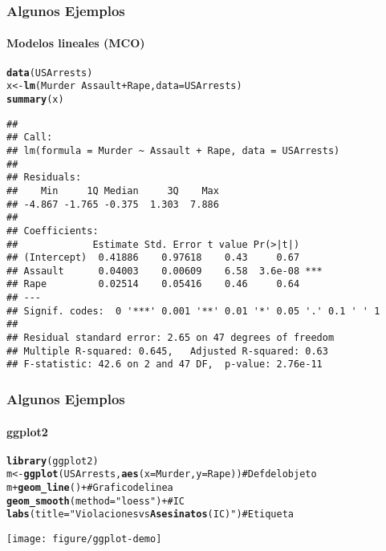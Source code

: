 \documentclass[10pt, letterpaper]{beamer}\usepackage{graphicx, color}
\makeatletter
\newcommand{\hlfunctioncall}[1]{\textcolor[rgb]{0.501960784313725,0,0.329411764705882}{\textbf{#1}}}%
\newcommand{\hlstring}[1]{\textcolor[rgb]{0.6,0.6,1}{#1}}%
\newcommand{\hlcomment}[1]{\textcolor[rgb]{0.180392156862745,0.6,0.341176470588235}{#1}}%
\newenvironment{kframe}{%
 \def\at@end@of@kframe{}%
 \ifinner\ifhmode%
  \def\at@end@of@kframe{\end{minipage}}%
  \begin{minipage}{\columnwidth}%
 \fi\fi%
 \def\FrameCommand##1{\hskip\@totalleftmargin \hskip-\fboxsep
 \colorbox{shadecolor}{##1}\hskip-\fboxsep
     \hskip-\linewidth \hskip-\@totalleftmargin \hskip\columnwidth}%
 \MakeFramed {\advance\hsize-\width
   \@totalleftmargin\z@ \linewidth\hsize
   \@setminipage}}%
 {\par\unskip\endMakeFramed%
 \at@end@of@kframe}
\newenvironment{knitrout}{}{} %
\makeatother
\begin{document}
\begin{frame}[fragile]
\frametitle{Algunos Ejemplos}
\framesubtitle{Modelos lineales (MCO)}
\begin{knitrout}\scriptsize
{}\color{fgcolor}\begin{kframe}
\begin{alltt}
\hlfunctioncall{data}(USArrests)
x <- \hlfunctioncall{lm}(Murder ~ Assault + Rape, data = USArrests)
\hlfunctioncall{summary}(x)
\end{alltt}
\begin{verbatim}
## 
## Call:
## lm(formula = Murder ~ Assault + Rape, data = USArrests)
## 
## Residuals:
##    Min     1Q Median     3Q    Max 
## -4.867 -1.765 -0.375  1.303  7.886 
## 
## Coefficients:
##             Estimate Std. Error t value Pr(>|t|)    
## (Intercept)  0.41886    0.97618    0.43     0.67    
## Assault      0.04003    0.00609    6.58  3.6e-08 ***
## Rape         0.02514    0.05416    0.46     0.64    
## ---
## Signif. codes:  0 '***' 0.001 '**' 0.01 '*' 0.05 '.' 0.1 ' ' 1 
## 
## Residual standard error: 2.65 on 47 degrees of freedom
## Multiple R-squared: 0.645,	Adjusted R-squared: 0.63 
## F-statistic: 42.6 on 2 and 47 DF,  p-value: 2.76e-11
\end{verbatim}
\end{kframe}
\end{knitrout}

\end{frame}

\begin{frame}[fragile]
\frametitle{Algunos Ejemplos}
\framesubtitle{ggplot2}
\begin{knitrout}\scriptsize
{}\color{fgcolor}\begin{kframe}
\begin{alltt}
\hlfunctioncall{library}(ggplot2)
m <- \hlfunctioncall{ggplot}(USArrests, \hlfunctioncall{aes}(x=Murder,y=Rape)) \hlcomment{# Def del objeto}
m + \hlfunctioncall{geom_line}() + \hlcomment{# Grafico de linea}
  \hlfunctioncall{geom_smooth}(method=\hlstring{"loess"}) + # IC
  \hlfunctioncall{labs}(title=\hlstring{"Violaciones vs \hlfunctioncall{Asesinatos} (IC)"}) # Etiqueta
\end{alltt}
\end{kframe}
\texttt{[image: figure/ggplot-demo]} 

\end{knitrout}

\end{frame}

\end{document}
